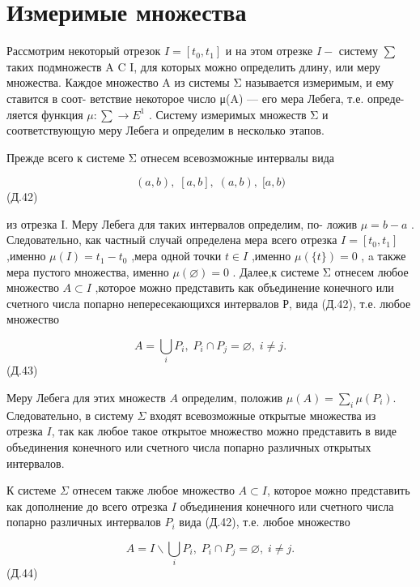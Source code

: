 \documentclass[8pt]{extarticle}
\begin{document}
\section*{Измеримые множества}

Рассмотрим некоторый отрезок \(I = \left\lbrack  {{t}_{0},{t}_{1}}\right\rbrack\) и на этом отрезке \(I -\) систему \(\sum\) таких подмножеств A C I, для которых можно определить длину, или меру множества. Каждое множество A из системы Σ называется измеримым, и ему ставится в соот- ветствие некоторое число μ(A) — его мера Лебега, т.е. опреде- ляется функция \(\mu  : \sum  \rightarrow  {E}^{1}\) . Систему измеримых множеств Σ и соответствующую меру Лебега и определим в несколько этапов.

Прежде всего к системе Σ отнесем всевозможные интервалы вида

\[
\left( {a,b}\right) ,\;\left\lbrack  {a,b}\right\rbrack  ,\;\left( {a,b}\right) ,\;\lbrack a,b)
\]
 (Д.42)

из отрезка I. Меру Лебега для таких интервалов определим, по- ложив \(\mu  = b - a\) . Следовательно, как частный случай определена мера всего отрезка \(I = \left\lbrack  {{t}_{0},{t}_{1}}\right\rbrack\) ,именно \(\mu \left( I\right)  = {t}_{1} - {t}_{0}\) ,мера одной точки \(t \in  I\) ,именно \(\mu \left( {\{ t\} }\right)  = 0\) , a также мера пустого множества, именно \(\mu \left( \varnothing \right)  = 0\) . Далее,к системе Σ отнесем любое множество \(A \subset  I\) ,которое можно представить как объединение конечного или счетного числа попарно непересекающихся интервалов Р, вида (Д.42), т.е. любое множество

\[
A = \mathop{\bigcup }\limits_{i}{P}_{i},\;{P}_{i} \cap  {P}_{j} = \varnothing ,\;i \neq  j.
\]
 (Д.43)

Меру Лебега для этих множеств \(A\) определим, положив \(\mu \left( A\right)  = \mathop{\sum }\limits_{i}\mu \left( {P}_{i}\right)\). Следовательно, в систему \(\Sigma\) входят всевозможные открытые множества из отрезка \(I\), так как любое такое открытое множество можно представить в виде объединения конечного или счетного числа попарно различных открытых интервалов.

К системе \(\Sigma\) отнесем также любое множество \(A \subset  I\), которое можно представить как дополнение до всего отрезка \(I\) объединения конечного или счетного числа попарно различных интервалов \({P}_{i}\) вида (Д.42), т.е. любое множество

\[
A = I \smallsetminus  \mathop{\bigcup }\limits_{i}{P}_{i},\;{P}_{i} \cap  {P}_{j} = \varnothing ,\;i \neq  j.
\]
 (Д.44)
\end{document}
